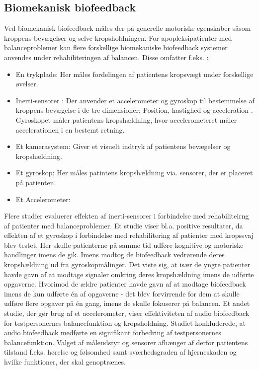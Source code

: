 \subsection{Biomekanisk biofeedback}
Ved biomekanisk biofeedback måles der på generelle motoriske egenskaber såsom kroppens bevægelser og selve kropsholdningen. For apopleksipatienter med balanceproblemer kan flere forskellige biomekaniske biofeedback systemer anvendes under rehabiliteringen af balancen. Disse omfatter f.eks. \cite{Giggins2013}:
\begin{itemize}
\item En trykplade: Her måles fordelingen af patientens kropsvægt under forskellige øvelser. 
\item Inerti-sensorer  : Der anvender et accelerometer og gyroskop til bestemmelse af kroppens bevægelse i de tre dimensioner: Position, hastighed og acceleration . Gyroskopet måler patientens kropshældning, hvor accelerometeret måler accelerationen i en bestemt retning.
\item Et kamerasystem: Giver et visuelt indtryk af patientens bevægelser og kropshældning. 
\item Et gyroskop: Her måles patintens kropshældning via. sensorer, der er placeret på patienten.
\item Et Accelerometer: 
\end{itemize}

Flere studier evaluerer effekten af inerti-sensorer i forbindelse med rehabiliteirng af patienter med balanceproblemer. Et studie viser bl.a. positive resultater, da effekten af et gyroskop i forbindelse med rehabilitering af patienter med kropssvaj blev testet. Her skulle patienterne på samme tid udføre kognitive og motoriske handlinger imens de gik. Imens modtog de biofeedback vedrørende deres kropshældning ud fra gyroskopmålinger. Det viste sig, at især de yngre patienter havde gavn af at modtage signaler omkring deres kropshældning imens de udførte opgaverne. Hvorimod de ældre patienter havde gavn af at modtage biofeedback imens de kun udførte én af opgaverne - det blev forvirrende for dem at skulle udføre flere opgaver på én gang, imens de skulle fokuserer på balancen. Et andet studie, der gør brug af et accelerometer, viser effektiviteten af audio biofeedback for testpersonernes balancefunktion og kropsholdning. Studiet konkluderede, at audio biofeedback  medførte en signifikant forbedring af testpersonernes balancefunktion. \cite{Giggins2013} 
Valget af måleudstyr og sensorer afhænger af derfor patientens tilstand f.eks. hørelse og følsomhed samt sværhedsgraden af hjerneskaden og hvilke funktioner, der skal genoptrænes. \cite{Hjaelpemiddelbasen}


